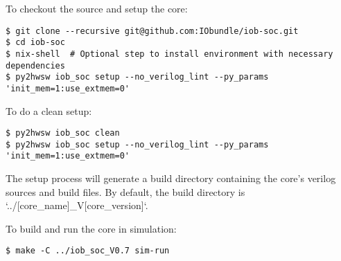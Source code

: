 %

To checkout the source and setup the core:

\begin{verbatim}
$ git clone --recursive git@github.com:IObundle/iob-soc.git
$ cd iob-soc
$ nix-shell  # Optional step to install environment with necessary dependencies
$ py2hwsw iob_soc setup --no_verilog_lint --py_params 'init_mem=1:use_extmem=0'
\end{verbatim}

To do a clean setup:

\begin{verbatim}
$ py2hwsw iob_soc clean
$ py2hwsw iob_soc setup --no_verilog_lint --py_params 'init_mem=1:use_extmem=0'
\end{verbatim}

The setup process will generate a build directory containing the core's verilog sources and build files.
By default, the build directory is `../[core\_name]\_V[core\_version]`.

To build and run the core in simulation:
\begin{verbatim}
$ make -C ../iob_soc_V0.7 sim-run
\end{verbatim}
